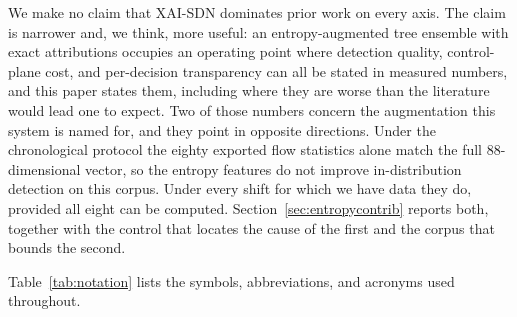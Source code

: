 \documentclass{ieeeaccess}
\begin{document}
We make no claim that XAI-SDN dominates prior work on every axis. The claim is narrower and, we think, more useful: an entropy-augmented tree ensemble with exact attributions occupies an operating point where detection quality, control-plane cost, and per-decision transparency can all be stated in measured numbers, and this paper states them, including where they are worse than the literature would lead one to expect. Two of those numbers concern the augmentation this system is named for, and they point in opposite directions. Under the chronological protocol the eighty exported flow statistics alone match the full 88-dimensional vector, so the entropy features do not improve in-distribution detection on this corpus. Under every shift for which we have data they do, provided all eight can be computed. Section~\ref{sec:entropycontrib} reports both, together with the control that locates the cause of the first and the corpus that bounds the second.

Table~\ref{tab:notation} lists the symbols, abbreviations, and acronyms used throughout.
\end{document}
